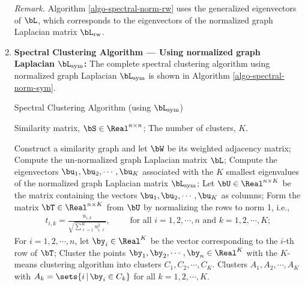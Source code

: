 \documentclass[12pt]{article}
\begin{document}
\begin{enumerate}[label=\textbf{\arabic*.}]
	\textit{Remark.} Algorithm \ref{algo-spectral-norm-rw} uses the generalized eigenvectors of $\bL$, which corresponds to the eigenvectors of the normalized graph Laplacian matrix $\bL_{\mathrm{rw}}$. 
	
	\item \textbf{Spectral Clustering Algorithm --- Using normalized graph Laplacian $\bL_{\mathrm{sym}}$:} The complete spectral clustering algorithm using normalized graph Laplacian $\bL_{\mathrm{sym}}$ is shown in Algorithm \ref{algo-spectral-norm-sym}. 
	
	\begin{minipage}{\linewidth}
		\begin{algorithm}[H]
		\caption{Spectral Clustering Algorithm (using $\bL_{\mathrm{sym}}$)}\label{algo-spectral-norm-sym}
			\begin{algorithmic}[1]
				\REQUIRE Similarity matrix, $\bS \in \Real^{n \times n}$; 
				\REQUIRE The number of clusters, $K$. 
				
				\STATE Construct a similarity graph and let $\bW$ be its weighted adjacency matrix; 
				\STATE Compute the un-normalized graph Laplacian matrix $\bL$; 
				\STATE Compute the eigenvectors $\bu_1, \bu_2, \cdots, \bu_K$ associated with the $K$ smallest eigenvalues of the normalized graph Laplacian matrix $\bL_{\mathrm{sym}}$; 
				\STATE Let $\bU \in \Real^{n \times K}$ be the matrix containing the vectors $\bu_1, \bu_2, \cdots, \bu_K$ as columns; 
				\STATE Form the matrix $\bT \in \Real^{n \times K}$ from $\bU$ by normalizing the rows to norm 1, i.e., 
				\begin{align*}
					t_{i, k} = \frac{u_{i, k}}{\sqrt{\sum_{\ell=1}^K u_{i,\ell}^2}}, \qquad \text{ for all } i = 1, 2, \cdots, n \text{ and } k = 1, 2, \cdots, K; 
				\end{align*}
				\STATE For $i = 1, 2, \cdots, n$, let $\by_i \in \Real^K$ be the vector corresponding to the $i$-th row of $\bT$; 
				\STATE Cluster the points $\by_1, \by_2, \cdots, \by_n \in \Real^K$ with the $K$-means clustering algorithm into clusters $C_1, C_2, \cdots, C_K$. 
				\RETURN Clusters $A_1, A_2, \cdots, A_K$ with $A_k = \sets{i \,\vert\, \by_i \in C_k}$ for all $k = 1, 2, \cdots, K$. 
			\end{algorithmic}
		\end{algorithm}
	\end{minipage}
	

\end{enumerate}
\end{document}
